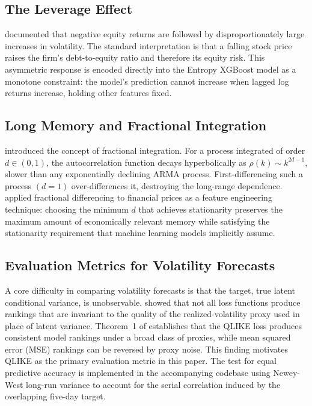\documentclass[12pt]{article}
\begin{document}
\subsection*{The Leverage Effect}

\citet{Black1976} documented that negative equity returns are followed by
disproportionately large increases in volatility.  The standard interpretation
is that a falling stock price raises the firm's debt-to-equity ratio and
therefore its equity risk.  This asymmetric response is encoded directly into
the Entropy XGBoost model as a monotone constraint: the model's prediction
cannot increase when lagged log returns increase, holding other features fixed.

\subsection*{Long Memory and Fractional Integration}

\citet{GrangerJoyeux1980} introduced the concept of fractional integration.
For a process integrated of order $d \in (0,1)$, the autocorrelation function
decays hyperbolically as $\rho(k) \sim k^{2d-1}$, slower than any
exponentially declining ARMA process.  First-differencing such a process
$(d = 1)$ over-differences it, destroying the long-range dependence.
\citet{LopezDePrado2018} applied fractional differencing to financial prices
as a feature engineering technique: choosing the minimum $d$ that achieves
stationarity preserves the maximum amount of economically relevant memory
while satisfying the stationarity requirement that machine learning models
implicitly assume.

\subsection*{Evaluation Metrics for Volatility Forecasts}

A core difficulty in comparing volatility forecasts is that the target, true
latent conditional variance, is unobservable.  \citet{Patton2011} showed that
not all loss functions produce rankings that are invariant to the quality of the
realized-volatility proxy used in place of latent variance.  Theorem~1 of
\citet{Patton2011} establishes that the QLIKE loss produces consistent model
rankings under a broad class of proxies, while mean squared error (MSE)
rankings can be reversed by proxy noise.  This finding motivates QLIKE as the
primary evaluation metric in this paper.  The \citet{DieboldMariano1995} test
for equal predictive accuracy is implemented in the accompanying codebase using
Newey-West long-run variance to account for the serial correlation induced by
the overlapping five-day target.
\end{document}
